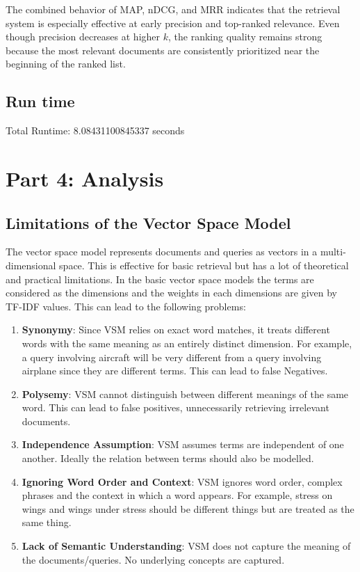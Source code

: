 \documentclass{article}
\begin{document}
The combined behavior of MAP, nDCG, and MRR indicates that the retrieval system is especially effective at early precision and top-ranked relevance. Even though precision decreases at higher $k$, the ranking quality remains strong because the most relevant documents are consistently prioritized near the beginning of the ranked list.

\subsection{Run time}
Total Runtime: 8.08431100845337 seconds


\section{Part 4: Analysis}
\subsection{Limitations of the Vector Space Model}
The vector space model represents documents and queries as vectors in a multi-dimensional space. This is effective for basic retrieval but has a lot of theoretical and practical limitations. In the basic vector space models the terms are considered as the dimensions and the weights in each dimensions are given by TF-IDF values. This can lead to the following problems:
\begin{enumerate}
    \item \textbf{Synonymy}: Since VSM relies on exact word matches, it treats different words with the same meaning as an entirely distinct dimension. For example, a query involving aircraft will be very different from a query involving airplane since they are different terms. This can lead to false Negatives.

    \item \textbf{Polysemy}: VSM cannot distinguish between different meanings of the same word. This can lead to false positives, unnecessarily retrieving irrelevant documents.

    \item \textbf{Independence Assumption}: VSM assumes terms are independent of one another. Ideally the relation between terms should also be modelled.

    \item \textbf{Ignoring Word Order and Context}: VSM ignores word order, complex phrases and the context in which a word appears. For example, stress on wings and wings under stress should be different things but are treated as the same thing.

    \item \textbf{Lack of Semantic Understanding}: VSM does not capture the meaning of the documents/queries. No underlying concepts are captured.
\end{enumerate}
\end{document}
